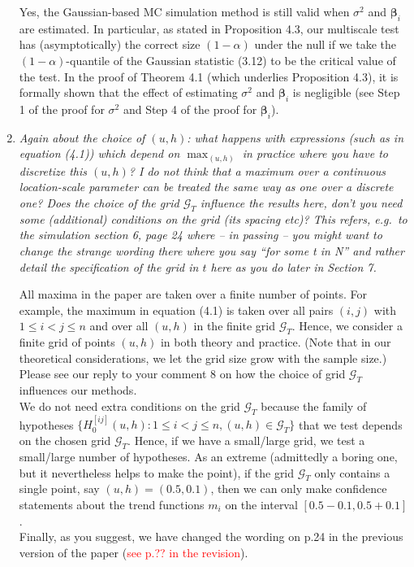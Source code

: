 \documentclass[a4paper,12pt]{article}
\begin{document}
\begin{enumerate}[label=\arabic*.,leftmargin=0.6cm]
Yes, the Gaussian-based MC simulation method is still valid when $\sigma^2$ and $\boldsymbol{\beta}_i$ are estimated. In particular, as stated in Proposition 4.3, our multiscale test has (asymptotically) the correct size $(1-\alpha)$ under the null if we take the $(1-\alpha)$-quantile of the Gaussian statistic (3.12) to be the critical value of the test. In the proof of Theorem 4.1 (which underlies Proposition 4.3), it is formally shown that the effect of estimating $\sigma^2$ and $\boldsymbol{\beta}_i$ is negligible (see Step 1 of the proof for $\sigma^2$ and Step 4 of the proof for $\boldsymbol{\beta}_i$).
  

\item \textit{Again about the choice of $(u, h)$: what happens with expressions (such as in equation (4.1)) which depend on $\max_{(u,h)}$ in practice where you have to discretize this $(u, h)$? I do not think that a maximum over a continuous location-scale parameter can be treated the same way as one over a discrete one? Does the choice of the grid $\mathcal{G}_T$ influence the results here, don't you need some (additional) conditions on the grid (its spacing etc)? This refers, e.g.\ to the simulation section 6, page 24 where -- in passing -- you might want to change the strange wording there where you say ``for some t in N'' and rather detail the specification of the grid in $t$ here as you do later in Section 7.}  

All maxima in the paper are taken over a finite number of points. For example, the maximum in equation (4.1) is taken over all pairs $(i,j)$ with $1 \le i < j \le n$ and over all $(u,h)$ in the finite grid $\mathcal{G}_T$. Hence, we consider a finite grid of points $(u,h)$ in both theory and practice. (Note that in our theoretical considerations, we let the grid size grow with the sample size.) \\
Please see our reply to your comment 8 on how the choice of grid $\mathcal{G}_T$ influences our methods. \\
We do not need extra conditions on the grid $\mathcal{G}_T$ because the family of hypotheses $\{H_0^{[ij]}(u,h): 1 \le i < j \le n, (u,h) \in \mathcal{G}_T \}$ that we test depends on the chosen grid $\mathcal{G}_T$. Hence, if we have a small/large grid, we test a small/large number of hypotheses. As an extreme (admittedly a boring one, but it nevertheless helps to make the point), if the grid $\mathcal{G}_T$ only contains a single point, say $(u,h) = (0.5, 0.1)$, then we can only make confidence statements about the trend functions $m_i$ on the interval $[0.5-0.1,0.5+0.1]$. \\
Finally, as you suggest, we have changed the wording on p.24 in the previous version of the paper (\textcolor{red}{see p.?? in the revision}). 



\end{enumerate}
\end{document}
